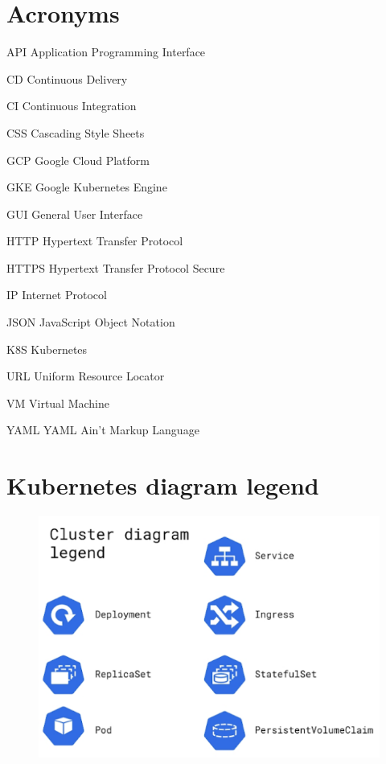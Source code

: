 \documentclass[thesis=B,english]{FITthesis}[2019/12/23]
\begin{document}




\appendix

\chapter{Acronyms}
\begin{description}
	\item{API} Application Programming Interface
	\item{CD} Continuous Delivery
	\item{CI} Continuous Integration
	\item{CSS} Cascading Style Sheets
	\item{GCP} Google Cloud Platform
	\item{GKE} Google Kubernetes Engine
	\item{GUI} General User Interface
	\item{HTTP} Hypertext Transfer Protocol
	\item{HTTPS} Hypertext Transfer Protocol Secure
	\item{IP} Internet Protocol
	\item{JSON} JavaScript Object Notation
	\item{K8S} Kubernetes
	\item{URL} Uniform Resource Locator
	\item{VM} Virtual Machine
	\item{YAML} YAML Ain't Markup Language
	
\end{description}

\chapter{Kubernetes diagram legend}
\begin{figure}[H]
\centering
\hspace*{-0.5cm}
\includegraphics[scale=0.7]{legend}
\end{figure}
\end{document}
